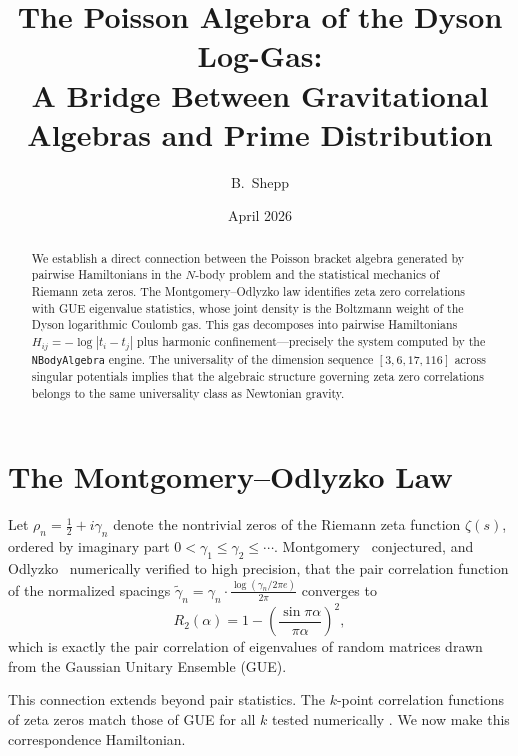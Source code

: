 \documentclass[11pt,a4paper]{article}
\title{The Poisson Algebra of the Dyson Log-Gas:\\
  A Bridge Between Gravitational Algebras and Prime Distribution}
\author{B.\ Shepp}
\date{April 2026}
\begin{document}
\maketitle

\begin{abstract}
We establish a direct connection between the Poisson bracket algebra
generated by pairwise Hamiltonians in the $N$-body problem and the
statistical mechanics of Riemann zeta zeros. The Montgomery--Odlyzko law
identifies zeta zero correlations with GUE eigenvalue statistics, whose
joint density is the Boltzmann weight of the Dyson logarithmic Coulomb gas.
This gas decomposes into pairwise Hamiltonians $H_{ij} = -\log|t_i - t_j|$
plus harmonic confinement---precisely the system computed by the
\texttt{NBodyAlgebra} engine. The universality of the dimension sequence
$[3, 6, 17, 116]$ across singular potentials implies that the algebraic
structure governing zeta zero correlations belongs to the same universality
class as Newtonian gravity.
\end{abstract}

\tableofcontents

\section{The Montgomery--Odlyzko Law}
\label{sec:montgomery}

Let $\rho_n = \tfrac{1}{2} + i\gamma_n$ denote the nontrivial zeros of
the Riemann zeta function $\zeta(s)$, ordered by imaginary part
$0 < \gamma_1 \le \gamma_2 \le \cdots$. Montgomery~\cite{Montgomery1973}
conjectured, and Odlyzko~\cite{Odlyzko1987} numerically verified to high
precision, that the pair correlation function of the normalized spacings
$\tilde\gamma_n = \gamma_n \cdot \frac{\log(\gamma_n / 2\pi e)}{2\pi}$
converges to
\begin{equation}\label{eq:pair-correlation}
  R_2(\alpha) = 1 - \left(\frac{\sin \pi\alpha}{\pi\alpha}\right)^2,
\end{equation}
which is exactly the pair correlation of eigenvalues of random matrices
drawn from the Gaussian Unitary Ensemble (GUE).

This connection extends beyond pair statistics. The $k$-point correlation
functions of zeta zeros match those of GUE for all $k$ tested numerically
\cite{Rudnick1996, Hejhal1994}. We now make this correspondence
Hamiltonian.

\end{document}
